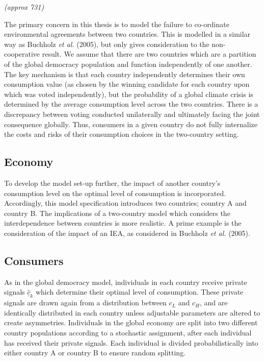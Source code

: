 \documentclass[11pt,preprint, authoryear]{elsarticle}
\numberwithin{equation}{section}
\numberwithin{figure}{section}
\numberwithin{table}{section}
\begin{document}
\emph{(approx 731)}

The primary concern in this thesis is to model the failure to
co-ordinate environmental agreements between two countries. This is
modelled in a similar way as Buchholz \emph{et al.} (2005), but only
gives consideration to the non-cooperative result. We assume that there
are two countries which are a partition of the global democracy
population and function independently of one another. The key mechanism
is that each country independently determines their own consumption
value (as chosen by the winning candidate for each country upon which
was voted independently), but the probability of a global climate crisis
is determined by the average consumption level across the two countries.
There is a discrepancy between voting conducted unilaterally and
ultimately facing the joint consequence globally. Thus, consumers in a
given country do not fully internalize the costs and risks of their
consumption choices in the two-country setting.

\hypertarget{economy-1}{%
\subsection*{Economy}\label{economy-1}}

To develop the model set-up further, the impact of another country's
consumption level on the optimal level of consumption is incorporated.
Accordingly, this model specification introduces two countries; country
A and country B. The implications of a two-country model which considers
the interdependence between countries is more realistic. A prime example
is the consideration of the impact of an IEA, as considered in Buchholz
\emph{et al.} (2005).

\hypertarget{consumers-1}{%
\subsection*{Consumers}\label{consumers-1}}

As in the global democracy model, individuals in each country receive
private signals \(\hat{\underline{c}}_k\) which determine their optimal
level of consumption. These private signals are drawn again from a
distribution between \(c_L\) and \(c_H\), and are identically
distributed in each country unless adjustable parameters are altered to
create asymmetries. Individuals in the global economy are split into two
different country populations according to a stochastic assignment,
after each individual has received their private signals. Each
individual is divided probabilistically into either country A or country
B to ensure random splitting.
\end{document}
